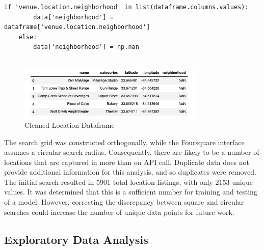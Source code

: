 \documentclass[11pt]{amsart}
\begin{document}
\begin{lstlisting}[caption={Neighborhood Data Screening Clause}]
 if 'venue.location.neighborhood' in list(dataframe.columns.values):
        data['neighborhood'] = dataframe['venue.location.neighborhood']
    else: 
        data['neighborhood'] = np.nan
        
\end{lstlisting}
\begin{figure}
\includegraphics[width=0.8\textwidth]{Foursquare_API_output_table_cleaned}
\caption{Cleaned Location Dataframe}
\label{tab:fsclean}
\end{figure}

The search grid was constructed orthogonally, while the Foursquare interface assumes a circular search radius. Consequently, there are likely to be a number of locations that are captured in more than on API call. Duplicate data does not provide additional information for this analysis, and so duplicates were removed. The initial search resulted in 5901 total location listings, with only 2153 unique values. It was determined that this is a sufficient number for training and testing of a model. However, correcting the discrepancy between square and circular searches could increase the number of unique data points for future work. 
\subsection{Exploratory Data Analysis}
\end{document}
